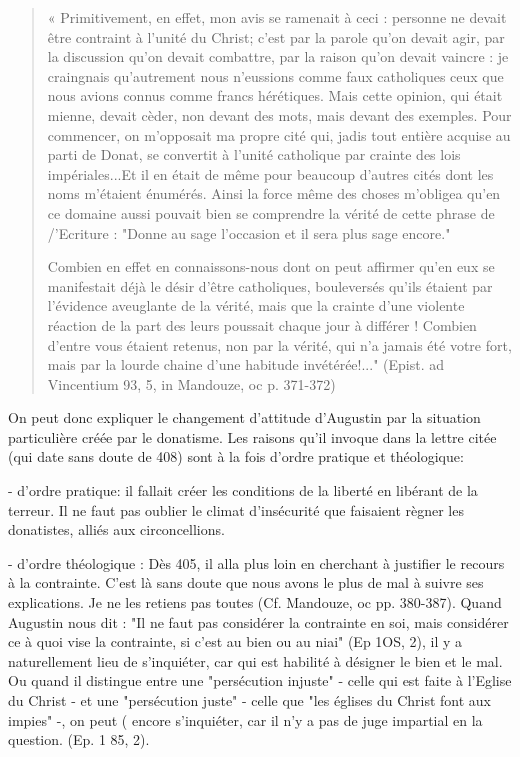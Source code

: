 \begin{quote}
    « Primitivement, en effet, mon avis se ramenait à ceci : personne ne devait être contraint à l'unité du Christ; c'est par la parole qu'on devait agir, par la discussion qu'on devait combattre, par la raison qu'on devait vaincre : je craingnais qu'autrement nous n'eussions comme faux catholiques ceux que nous avions connus comme francs hérétiques. Mais cette opinion, qui était mienne, devait cèder, non devant des mots, mais devant des exemples. Pour commencer, on m'opposait ma propre cité qui, jadis tout entière acquise au parti de Donat, se convertit à l'unité
catholique par crainte des lois impériales...Et il en était de même pour beaucoup d'autres cités dont les noms m'étaient énumérés. Ainsi la force même des choses m'obligea qu'en ce domaine aussi pouvait bien se comprendre la vérité de cette phrase de /'Ecriture : "Donne au sage l'occasion et il sera plus sage encore."

Combien en effet en connaissons-nous dont on peut affirmer qu'en eux se manifestait déjà le désir d'être catholiques, bouleversés qu'ils étaient par l'évidence aveuglante de la vérité, mais que la crainte d'une violente réaction de la part des leurs poussait chaque jour à différer ! Combien d'entre vous étaient retenus, non par la
vérité, qui n'a jamais été	votre fort, mais par la lourde chaine d'une habitude invétérée!..." (Epist. ad Vincentium 93, 5, in Mandouze, oc p. 371-372)
\end{quote}

 
On peut donc expliquer le changement d'attitude d'Augustin par la situation particulière créée par le donatisme. Les raisons qu'il invoque dans la lettre citée (qui date sans doute de 408) sont à la fois d'ordre pratique et théologique:

-	d'ordre  pratique: il fallait créer les conditions de la liberté en libérant de la terreur. Il ne faut pas oublier le climat d'insécurité que faisaient règner les donatistes, alliés aux circoncellions.

-	d'ordre théologique : Dès 405, il alla plus loin en cherchant à justifier le recours à la contrainte. C'est là sans doute que nous avons le plus de mal à suivre ses explications. Je ne les retiens pas toutes (Cf. Mandouze, oc pp. 380-387). Quand Augustin nous dit : "Il ne faut pas considérer la contrainte en soi, mais considérer ce à quoi vise la contrainte, si c'est au bien ou au niai" (Ep 1OS, 2), il y a naturellement lieu de s'inquiéter, car qui est habilité à désigner le bien et le mal. Ou quand il distingue entre une "persécution injuste"  - celle qui est faite à l'Eglise du Christ - et
une "persécution juste" - celle que "les églises du Christ font aux impies" -, on peut	( encore s'inquiéter, car il n'y a pas de juge impartial en la question. (Ep. 1 85, 2).

